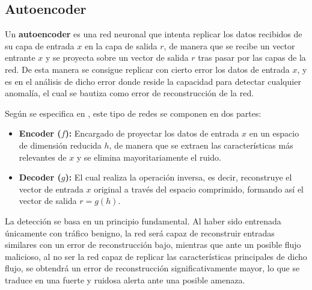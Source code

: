 \documentclass[12pt]{article}
\numberwithin{equation}{section} %
\begin{document}
    \vspace{10mm}





    \subsection{Autoencoder}\label{subsec: autoencoder}

    \vspace{5mm}

    Un \textbf{autoencoder} es una red neuronal que intenta replicar los datos recibidos de su capa de entrada $x$ en la capa de salida $r$, de manera que se recibe un vector entrante $x$ y se proyecta sobre un vector de salida $r$ tras pasar por las capas de la red. De esta manera se consigue replicar con cierto error los datos de entrada $x$, y es en el análisis de dicho error donde reside la capacidad para detectar cualquier anomalía, el cual se bautiza como error de reconstrucción de la red.
    
    \vspace{5mm}

    Según se especifica en \cite{goodfellow2016deep}, este tipo de redes se componen en dos partes:

    \vspace{5mm}

    \begin{itemize}
        \item \textbf{Encoder ($f$):} Encargado de proyectar los datos de entrada $x$ en un espacio de dimensión reducida $h$, de manera que se extraen las características más relevantes de $x$ y se elimina mayoritariamente el ruido.

        \vspace{5mm}

        \item \textbf{Decoder ($g$):} El cual realiza la operación inversa, es decir, reconstruye el vector de entrada $x$ original a través del espacio comprimido, formando así el vector de salida $r = g(h)$.
    \end{itemize}    

    \vspace{5mm}

    La detección se basa en un principio fundamental. Al haber sido entrenada únicamente con tráfico benigno, la red será capaz de reconstruir entradas similares con un error de reconstrucción bajo, mientras que ante un posible flujo malicioso, al no ser la red capaz de replicar las características principales de dicho flujo, se obtendrá un error de reconstrucción significativamente mayor, lo que se traduce en una fuerte y ruidosa alerta ante una posible amenaza. 
\end{document}
